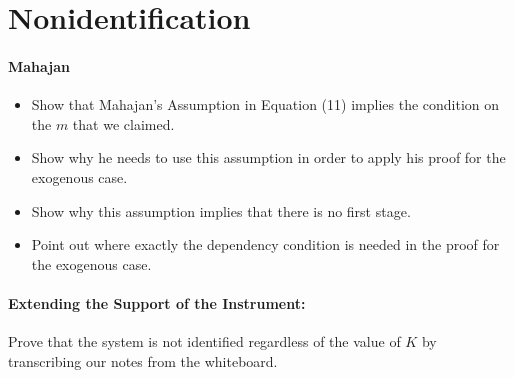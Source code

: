 \section{Nonidentification}

\paragraph{Mahajan}
\begin{itemize}
  \item Show that Mahajan's Assumption in Equation (11) implies the condition on the $m$ that we claimed.
  \item Show why he needs to use this assumption in order to apply his proof for the exogenous case. 
  \item Show why this assumption implies that there is no first stage.
  \item Point out where exactly the dependency condition is needed in the proof for the exogenous case.
\end{itemize}

\paragraph{Extending the Support of the Instrument:}
Prove that the system is not identified regardless of the value of $K$ by transcribing our notes from the whiteboard.
